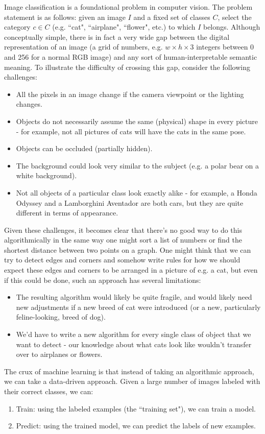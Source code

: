 Image classification is a foundational problem in computer vision. The problem statement is as follows: given an image $I$ and a fixed set of classes $C$, select the category $c \in C$ (e.g. ``cat", ``airplane", ``flower", etc.) to which $I$ belongs. Although conceptually simple, there is in fact a very wide gap between the digital representation of an image (a grid of numbers, e.g. $w \times h \times 3$ integers between 0 and 256 for a normal RGB image) and any sort of human-interpretable semantic meaning. To illustrate the difficulty of crossing this gap, consider the following challenges:
\begin{itemize}
\item All the pixels in an image change if the camera viewpoint or the lighting changes.
\item Objects do not necessarily assume the same (physical) shape in every picture - for example, not all pictures of cats will have the cats in the same pose.
\item Objects can be occluded (partially hidden).
\item The background could look very similar to the subject (e.g. a polar bear on a white background).
\item Not all objects of a particular class look exactly alike - for example, a Honda Odyssey and a Lamborghini Aventador are both cars, but they are quite different in terms of appearance.
\end{itemize}
Given these challenges, it becomes clear that there's no good way to do this algorithmically in the same way one might sort a list of numbers or find the shortest distance between two points on a graph. One might think that we can try to detect edges and corners and somehow write rules for how we should expect these edges and corners to be arranged in a picture of e.g. a cat, but even if this could be done, such an approach has several limitations:
\begin{itemize}
\item The resulting algorithm would likely be quite fragile, and would likely need new adjustments if a new breed of cat were introduced (or a new, particularly feline-looking, breed of dog).
\item We'd have to write a new algorithm for every single class of object that we want to detect - our knowledge about what cats look like wouldn't transfer over to airplanes or flowers.
\end{itemize}
The crux of machine learning is that instead of taking an algorithmic approach, we can take a data-driven approach. Given a large number of images labeled with their correct classes, we can:
\begin{enumerate}
\item Train: using the labeled examples (the ``training set"), we can train a model.
\item Predict: using the trained model, we can predict the labels of new examples.
\end{enumerate}

